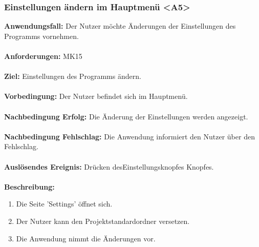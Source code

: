\documentclass[parskip=full]{scrartcl} %
\begin{document}
\subsubsection*{Einstellungen ändern im Hauptmenü <A5>}
\textbf{Anwendungsfall:} Der Nutzer möchte Änderungen der Einstellungen des Programms vornehmen. \\\\
\textbf{Anforderungen:} MK15\\\\
\textbf{Ziel:} Einstellungen des Programms ändern.\\\\
\textbf{Vorbedingung:}  Der Nutzer befindet sich im Hauptmenü.  \\\\
\textbf{Nachbedingung Erfolg:} Die Änderung der Einstellungen werden angezeigt.\\\\
\textbf{Nachbedingung Fehlschlag:} Die Anwendung informiert den Nutzer über den Fehlschlag.\\\\
\textbf{Auslösendes Ereignis:} Drücken desEinstellungsknopfes Knopfes. \\\\
\textbf{Beschreibung:}
\begin{enumerate}
    \item Die Seite 'Settings' öffnet sich.
    \item Der Nutzer kann den Projektstandardordner versetzen.
    \item Die Anwendung nimmt die Änderungen vor.
\end{enumerate}
\newpage
\end{document}
